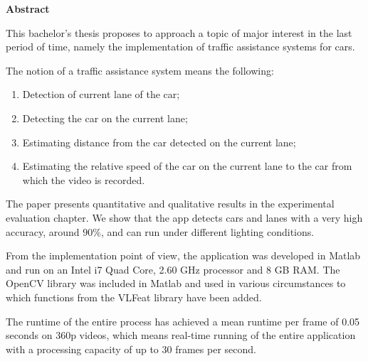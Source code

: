 \thispagestyle{plain}

\begin{center}
	\Large \textbf{Abstract}	
\end{center}

This bachelor's thesis proposes to approach a topic of major interest in the last period of time, namely the implementation of traffic assistance systems for cars.

The notion of a traffic assistance system means the following:
\begin{enumerate}
	\item Detection of current lane of the car;
	\item Detecting the car on the current lane;
	\item Estimating distance from the car detected on the current lane;
	\item Estimating the relative speed of the car on the current lane to the car from which the video is recorded.
\end{enumerate}

The paper presents quantitative and qualitative results in the experimental evaluation chapter. We show that the app detects cars and lanes with a very high accuracy, around $90\%$, and can run under different lighting conditions.

From the implementation point of view, the application was developed in Matlab and run on an Intel i7 Quad Core, 2.60 GHz processor and 8 GB RAM. The OpenCV library was included in Matlab and used in various circumstances to which functions from the VLFeat library have been added.

The runtime of the entire process has achieved a mean runtime per frame of 0.05 seconds on 360p videos, which means real-time running of the entire application with a processing capacity of up to 30 frames per second. 
\vspace*{\fill}